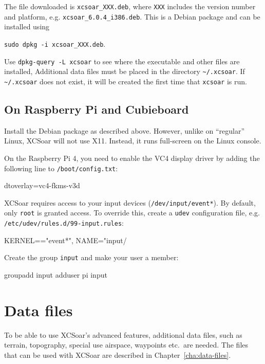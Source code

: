 The file downloaded is \verb|xcsoar_XXX.deb|, where \verb|XXX| includes
the version number and platform, e.g. \verb|xcsoar_6.0.4_i386.deb|.
This is a Debian package and can be installed using
\begin{center}
\verb|sudo dpkg -i xcsoar_XXX.deb|.
\end{center}
Use \verb|dpkg-query -L xcsoar| to see where the executable and 
other files are installed,
Additional data files must be placed in the directory
\verb|~/.xcsoar|.
If \verb|~/.xcsoar| does not exist, it will be created the first time
that \verb|xcsoar| is run.

\subsection*{On Raspberry Pi and Cubieboard}

Install the Debian package as described above.  However, unlike on
``regular'' Linux, XCSoar will not use X11.  Instead, it runs
full-screen on the Linux console.

On the Raspberry Pi 4, you need to enable the VC4 display driver by
adding the following line to \texttt{/boot/config.txt}:

\begin{verbatim*}
dtoverlay=vc4-fkms-v3d
\end{verbatim*}

XCSoar requires access to your input devices
(\texttt{/dev/input/event*}).  By default, only \texttt{root} is
granted access.  To override this, create a \texttt{udev}
configuration file, e.g. \texttt{/etc/udev/rules.d/99-input.rules}:

\begin{verbatim*}
KERNEL=="event*", NAME="input/%
\end{verbatim*}

Create the group \texttt{input} and make your user a member:

\begin{verbatim*}
groupadd input
adduser pi input
\end{verbatim*}

\section{Data files}\label{sec:data files}

To be able to use XCSoar's advanced features, additional data files, such as
terrain, topography, special use airspace, waypoints etc.\ are needed. The files
that can be used with XCSoar are described in Chapter~\ref{cha:data-files}.

